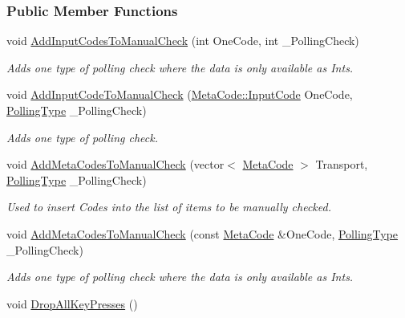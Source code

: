 \subsubsection*{Public Member Functions}
\begin{DoxyCompactItemize}
\item 
void \hyperlink{structphys_1_1internal_1_1EventManagerInternalData_a3f562c06139a3712bdb5ff843b3973bc}{AddInputCodesToManualCheck} (int OneCode, int \_\-PollingCheck)
\begin{DoxyCompactList}\small\item\em Adds one type of polling check where the data is only available as Ints. \item\end{DoxyCompactList}\item 
void \hyperlink{structphys_1_1internal_1_1EventManagerInternalData_abf8c7b472e4b19a0c0243dcaf49a38ae}{AddInputCodeToManualCheck} (\hyperlink{classphys_1_1MetaCode_a3e501cbb5bf0f6f1fdb7211465bda8d8}{MetaCode::InputCode} OneCode, \hyperlink{structphys_1_1internal_1_1EventManagerInternalData_ab9ab8380b84448aacf46a63050e159af}{PollingType} \_\-PollingCheck)
\begin{DoxyCompactList}\small\item\em Adds one type of polling check. \item\end{DoxyCompactList}\item 
void \hyperlink{structphys_1_1internal_1_1EventManagerInternalData_ac2e4044e2fc6eb2df18a3e274c175065}{AddMetaCodesToManualCheck} (vector$<$ \hyperlink{classphys_1_1MetaCode}{MetaCode} $>$ Transport, \hyperlink{structphys_1_1internal_1_1EventManagerInternalData_ab9ab8380b84448aacf46a63050e159af}{PollingType} \_\-PollingCheck)
\begin{DoxyCompactList}\small\item\em Used to insert Codes into the list of items to be manually checked. \item\end{DoxyCompactList}\item 
void \hyperlink{structphys_1_1internal_1_1EventManagerInternalData_a792d2c7bb8fe9e169e01650ca92f939e}{AddMetaCodesToManualCheck} (const \hyperlink{classphys_1_1MetaCode}{MetaCode} \&OneCode, \hyperlink{structphys_1_1internal_1_1EventManagerInternalData_ab9ab8380b84448aacf46a63050e159af}{PollingType} \_\-PollingCheck)
\begin{DoxyCompactList}\small\item\em Adds one type of polling check where the data is only available as Ints. \item\end{DoxyCompactList}\item 
\hypertarget{structphys_1_1internal_1_1EventManagerInternalData_ab1f4a0b147beb750deb77e000daa27cc}{
void \hyperlink{structphys_1_1internal_1_1EventManagerInternalData_ab1f4a0b147beb750deb77e000daa27cc}{DropAllKeyPresses} ()}
\label{structphys_1_1internal_1_1EventManagerInternalData_ab1f4a0b147beb750deb77e000daa27cc}


\end{DoxyCompactItemize}
